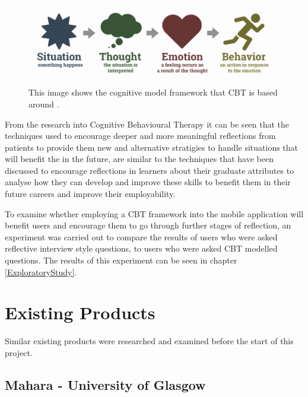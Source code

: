 \documentclass{l4proj}
\begin{document}
\begin{figure}[h!]
    \begin{centering}
    \includegraphics[scale=0.5]{images/cognitive-model.png}
    \caption{This image shows the cognitive model framework that CBT is based around \citep{therapist_aid_psychoeducation}.}
    \label{fig: CognitiveModel}
    \end{centering}
\end{figure}

From the research into Cognitive Behavioural Therapy it can be seen that the techniques used to encourage deeper and more meaningful reflections from 
patients to provide them new and alternative stratigies to handle situations that will benefit the in the future, are similar to the techniques that 
have been discussed to encourage reflections in learners about their graduate attributes to analyse how they can develop and improve these skills to 
benefit them in their future careers and improve their employability.

To examine whether employing a CBT framework into the mobile application will benefit users and encourage them to go through further stages of reflection,
an experiment was carried out to compare the results of users who were asked reflective interview style questions, to users who were asked CBT modelled
questions. The results of this experiment can be seen in chapter \ref{ExploratoryStudy}.

\section{Existing Products}

Similar existing products were researched and examined before the start of this project.

\subsection{Mahara - University of Glasgow}

\end{document}

